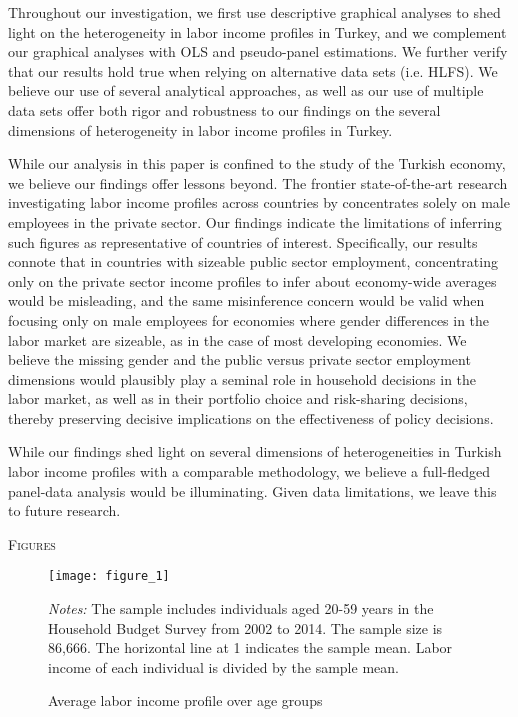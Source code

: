 \documentclass[12pt,author-year]{article}
\begin{document}
Throughout our investigation, we first use descriptive graphical analyses to shed light on the heterogeneity in labor income profiles in Turkey, and we complement our graphical analyses with OLS and pseudo-panel estimations. We further verify that our results hold true when relying on alternative data sets (i.e. HLFS). We believe our use of several analytical approaches, as well as our use of multiple data sets offer both rigor and robustness to our findings on the several dimensions of heterogeneity in labor income profiles in Turkey. 

While our analysis in this paper is confined to the study of the Turkish economy, we believe our findings offer lessons beyond. The frontier state-of-the-art research investigating labor income profiles across countries by \cite{Lagakos} concentrates solely on male employees in the private sector. Our findings indicate the limitations of inferring such figures as representative of countries of interest. Specifically, our results connote that in countries with sizeable public sector employment, concentrating only on the private sector income profiles to infer about economy-wide averages would be misleading, and the same misinference concern would be valid when focusing only on male employees for economies where gender differences in the labor market are sizeable, as in the case of most developing economies. We believe the missing gender and the public versus private sector employment dimensions would plausibly play a seminal role in household decisions in the labor market, as well as in their portfolio choice and risk-sharing decisions, thereby preserving decisive implications on the effectiveness of policy decisions.    

While our findings shed light on several dimensions of heterogeneities in Turkish labor income profiles with a comparable methodology, we believe a full-fledged panel-data analysis would be illuminating. Given data limitations, we leave this to future research. 
 

\clearpage

\pagebreak

\clearpage



\pagebreak
\begin{center}
	\textsc{\LARGE{Figures}}
\end{center}

\begin{figure}[H]
\label{figure1}
	\centering
	\texttt{[image: figure\_1]}
	\caption{Average labor income profile over age groups}
	\medskip
	\begin{minipage}{0.75\textwidth} %
		{\footnotesize \textit{Notes:} The sample includes individuals aged 20-59 years in the Household Budget Survey from 2002 to 2014. The sample size is 86,666. The horizontal line at 1 indicates the sample mean. Labor income of each individual is divided by the sample mean. \par}
	\end{minipage}
\end{figure}
\end{document}
